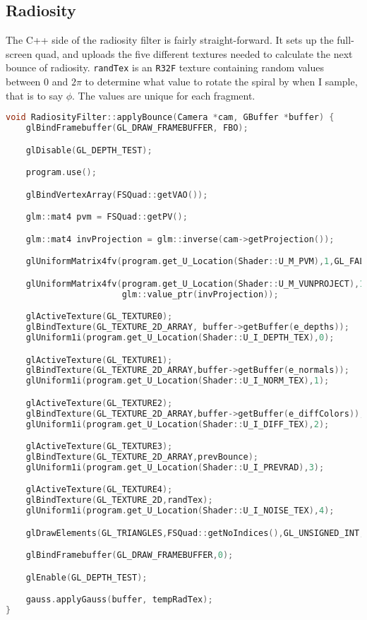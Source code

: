 \subsection{Radiosity}
The C++ side of the radiosity filter is fairly straight-forward. It sets up the full-screen quad, and uploads the five different textures needed to calculate the next bounce of radiosity. \verb=randTex= is an \verb=R32F= texture containing random values between 0 and $2\pi$ to determine what value to rotate the spiral by when I sample, that is to say $\phi$. The values are unique for each fragment.
\begin{lstlisting}[caption={Filters.cpp},language=c++]
void RadiosityFilter::applyBounce(Camera *cam, GBuffer *buffer) {
	glBindFramebuffer(GL_DRAW_FRAMEBUFFER, FBO);

	glDisable(GL_DEPTH_TEST);

	program.use();

	glBindVertexArray(FSQuad::getVAO());

	glm::mat4 pvm = FSQuad::getPV();

	glm::mat4 invProjection = glm::inverse(cam->getProjection());

	glUniformMatrix4fv(program.get_U_Location(Shader::U_M_PVM),1,GL_FALSE,glm::value_ptr(pvm));

	glUniformMatrix4fv(program.get_U_Location(Shader::U_M_VUNPROJECT),1,GL_FALSE,
					   glm::value_ptr(invProjection));

	glActiveTexture(GL_TEXTURE0);
	glBindTexture(GL_TEXTURE_2D_ARRAY, buffer->getBuffer(e_depths));
	glUniform1i(program.get_U_Location(Shader::U_I_DEPTH_TEX),0);

	glActiveTexture(GL_TEXTURE1);
	glBindTexture(GL_TEXTURE_2D_ARRAY,buffer->getBuffer(e_normals));
	glUniform1i(program.get_U_Location(Shader::U_I_NORM_TEX),1);

	glActiveTexture(GL_TEXTURE2);
	glBindTexture(GL_TEXTURE_2D_ARRAY,buffer->getBuffer(e_diffColors));
	glUniform1i(program.get_U_Location(Shader::U_I_DIFF_TEX),2);

	glActiveTexture(GL_TEXTURE3);
	glBindTexture(GL_TEXTURE_2D_ARRAY,prevBounce);
	glUniform1i(program.get_U_Location(Shader::U_I_PREVRAD),3);

	glActiveTexture(GL_TEXTURE4);
	glBindTexture(GL_TEXTURE_2D,randTex);
	glUniform1i(program.get_U_Location(Shader::U_I_NOISE_TEX),4);

	glDrawElements(GL_TRIANGLES,FSQuad::getNoIndices(),GL_UNSIGNED_INT,(void*) 0);

	glBindFramebuffer(GL_DRAW_FRAMEBUFFER,0);

	glEnable(GL_DEPTH_TEST);

	gauss.applyGauss(buffer, tempRadTex);
}
\end{lstlisting}

